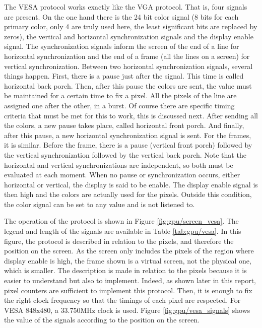 The VESA protocol works exactly like the VGA protocol. That is, four signals are present. On the 
one hand there is the 24 bit color signal (8 bits for each primary color, only 4 are truly used
here, the least significant bits are replaced by zeros), the vertical and 
horizontal synchronization signals and the display enable signal. The synchronization signals 
inform the screen of the end of a line for horizontal synchronization and the end of a frame (all 
the lines on a screen) for vertical synchronization. Between two horizontal synchronization 
signals, several things happen. First, there is a pause just after the signal. This time is called 
horizontal back porch. Then, after this pause the colors are sent, the value must be maintained for 
a certain time to fix a pixel. All the pixels of the line are assigned one after the other, in a 
burst. Of course there are specific timing criteria that must be met for this to work, this is 
discussed next. After sending all the colors, a new pause takes place, called horizontal front 
porch. And finally, after this pause, a new horizontal synchronization signal is sent. For the 
frames, it is similar. Before the frame, there is a pause (vertical front porch) followed by the 
vertical synchronization followed by the vertical back porch. Note that the horizontal and vertical 
synchronizations are independent, so both must be evaluated at each moment. When no pause or 
synchronization occurs, either horizontal or vertical, the display is said to be enable. The 
display enable signal is then high and the colors are actually used for the pixels. Outside this 
condition, the color signal can be set to any value and is not listened to. 

The operation of the protocol is shown in Figure \ref{fig:gpu/screen_vesa}. The legend and length
of the signals are available in Table \ref{tab:gpu/vesa}. In this figure, 
the protocol is described in relation to the pixels, and therefore the position on the screen. As 
the screen only includes the pixels of the region where display enable is high, the frame shown is 
a virtual screen, not the physical one, which is smaller. The description is made in relation to the 
pixels because 
it is easier to understand but also to implement. Indeed, as shown later in this report, pixel 
counters are sufficient to implement this protocol. Then, it is enough to fix the right clock 
frequency so that the timings of each pixel are respected. For VESA 848x480, a  33.750MHz clock
is used. Figure \ref{fig:gpu/vesa_signals} shows the value of the signals according to the position
on the screen.

